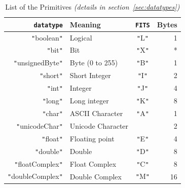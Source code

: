 \documentclass[11pt,a4paper]{ivoa}
\def\Aref#1{section~\ref{#1}}
\let\fg=\color
\def\attr#1{{\tt{\fg{DarkRed}#1}}}
\def\literalvalue#1{{\tt"}{{\fg{DarkPurple}#1}}{\tt"}}
\begin{document}
\begin{table}[hbt]
\begin{center}\begin{tabular}{|r|l|c|r|}
\hline
  {\attr{datatype}} & Meaning & \attr{FITS} &
      { Bytes} \\
 \hline
 \literalvalue{boolean}      & Logical         &\literalvalue{L}& 1  \\
 \literalvalue{bit}          & Bit             &\literalvalue{X}& *  \\
 \literalvalue{unsignedByte} & Byte (0 to 255) &\literalvalue{B}& 1  \\
 \literalvalue{short}        & Short Integer   &\literalvalue{I}& 2  \\
 \literalvalue{int}          & Integer         &\literalvalue{J}& 4  \\
 \literalvalue{long}         & Long integer    &\literalvalue{K}& 8  \\
 \literalvalue{char}         & ASCII Character &\literalvalue{A}& 1  \\
 \literalvalue{unicodeChar}  & Unicode Character&        & 2 \\
 \literalvalue{float}        & Floating point  &\literalvalue{E}& 4  \\
 \literalvalue{double}       & Double          &\literalvalue{D}& 8  \\
 \literalvalue{floatComplex} & Float Complex   &\literalvalue{C}& 8  \\
 \literalvalue{doubleComplex}& Double Complex  &\literalvalue{M}& 16 \\
\hline\end{tabular}\end{center}
\caption{\label{primitives}List of the Primitives
{\em(details in \Aref{sec:datatypes})}}\end{table}
\end{document}
